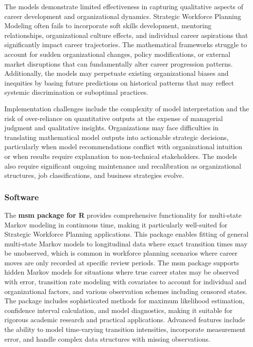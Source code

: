 \documentclass[main.tex]{subfiles}
\begin{document}
The models demonstrate limited effectiveness in capturing qualitative aspects of career development and organizational dynamics. Strategic Workforce Planning Modeling often fails to incorporate soft skills development, mentoring relationships, organizational culture effects, and individual career aspirations that significantly impact career trajectories\parencite{coursehero2024,thinkdev2023}. The mathematical frameworks struggle to account for sudden organizational changes, policy modifications, or external market disruptions that can fundamentally alter career progression patterns. Additionally, the models may perpetuate existing organizational biases and inequities by basing future predictions on historical patterns that may reflect systemic discrimination or suboptimal practices\parencite{thinkdev2023}.

Implementation challenges include the complexity of model interpretation and the risk of over-reliance on quantitative outputs at the expense of managerial judgment and qualitative insights\parencite{coursehero2024}. Organizations may face difficulties in translating mathematical model outputs into actionable strategic decisions, particularly when model recommendations conflict with organizational intuition or when results require explanation to non-technical stakeholders. The models also require significant ongoing maintenance and recalibration as organizational structures, job classifications, and business strategies evolve\parencite{thinkdev2023}.

\subsubsection{Software}

The \textbf{msm package for R} provides comprehensive functionality for multi-state Markov modeling in continuous time, making it particularly well-suited for Strategic Workforce Planning applications\parencite{jackson2024}. This package enables fitting of general multi-state Markov models to longitudinal data where exact transition times may be unobserved, which is common in workforce planning scenarios where career moves are only recorded at specific review periods. The msm package supports hidden Markov models for situations where true career states may be observed with error, transition rate modeling with covariates to account for individual and organizational factors, and various observation schemes including censored states. The package includes sophisticated methods for maximum likelihood estimation, confidence interval calculation, and model diagnostics, making it suitable for rigorous academic research and practical applications. Advanced features include the ability to model time-varying transition intensities, incorporate measurement error, and handle complex data structures with missing observations.
\end{document}
